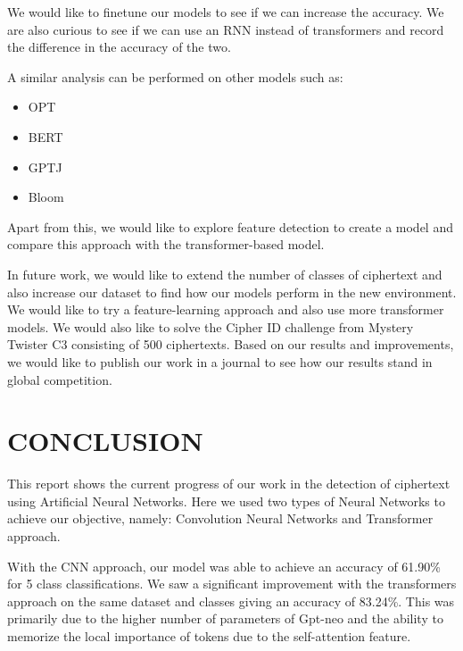 \documentclass[a4paper]{article}
\begin{document}
We would like to finetune our models to see if we can increase 
the accuracy. We are also curious to see if we can use an RNN 
instead of transformers and record the difference in the accuracy 
of the two.

A similar analysis can be performed on other models such as:
\begin{itemize}
    \item OPT
    \item BERT
    \item GPTJ
    \item Bloom
\end{itemize}

Apart from this, we would like to explore feature detection 
to create a model and compare this approach with the transformer-based 
model.

In future work, we would like to extend the number of classes of ciphertext 
and also increase our dataset to find how our models perform in the new 
environment. We would like to try a feature-learning approach and also 
use more transformer models.  We would also like to solve the Cipher ID challenge from Mystery Twister C3  consisting of 500 ciphertexts. Based on our results and improvements, we would like to publish our work in a journal to see how our results stand in global competition. 

\section{CONCLUSION}

This report shows the current progress of our work in the detection of ciphertext using Artificial Neural Networks. Here we used two types of Neural Networks to achieve our objective, namely: Convolution Neural Networks and Transformer approach. 

With the CNN approach, our model was able to achieve an accuracy of 61.90\% for 5 class classifications. We saw a significant improvement with the transformers approach on the same dataset and classes giving an accuracy of 83.24\%. This was primarily due to the higher number of parameters of Gpt-neo and the ability to memorize the local importance of tokens due to the self-attention feature. 

\newpage
\renewcommand{\refname}{REFERENCES}


\end{document}
